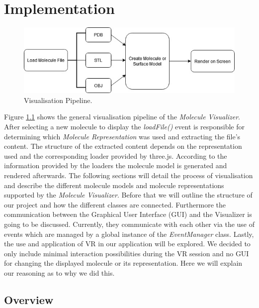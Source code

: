 %

\chapter{Implementation}
\label{sec:implementation}

\begin{figure}[htb]
	\centering
	\includegraphics[width=\textwidth]{gfx/visualisation_pipeline.jpg}
	\caption{Visualisation Pipeline.}
	\label{sec:implementation:vispipe}
\end{figure}

Figure \ref{sec:implementation:vispipe} shows the general visualisation pipeline of the \textit{Molecule Visualizer}. After selecting a new molecule to display the \textit{loadFile()} event is responsible for determining which \textit{Molecule Representation} was used and extracting the file's content. The structure of the extracted content depends on the representation used and the corresponding loader provided by three.js. According to the information provided by the loaders the molecule model is generated and rendered afterwards. The following sections will detail the process of visualisation and describe the different molecule models and molecule representations supported by the \textit{Molecule Visualizer}. Before that we will outline the structure of our project and how the different classes are connected. Furthermore the communication between the Graphical User Interface (GUI) and the Visualizer is going to be discussed. Currently, they communicate with each other via the use of events which are managed by a global instance of the \textit{EventManager} class. Lastly, the use and application of VR in our application will be explored. We decided to only include minimal interaction possibilities during the VR session and no GUI for changing the displayed molecule or its representation. Here we will explain our reasoning as to why we did this.

\section{Overview}
\label{sec:implementation:overview}

